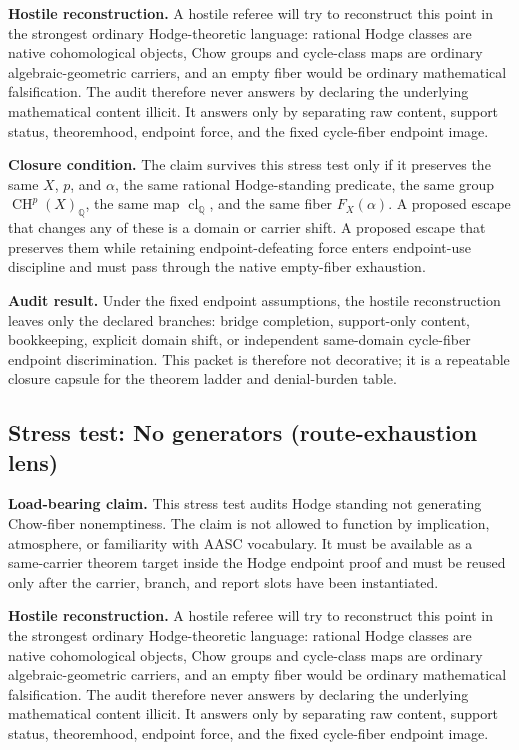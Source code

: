 \documentclass[11pt]{article}
\newcommand{\QQ}{\mathbb{Q}}
\newcommand{\CH}{\operatorname{CH}}
\newcommand{\clQ}{\operatorname{cl}_{\QQ}}
\begin{document}
\par\noindent\textbf{Hostile reconstruction.} A hostile referee will try to reconstruct this point in the strongest ordinary Hodge-theoretic language: rational Hodge classes are native cohomological objects, Chow groups and cycle-class maps are ordinary algebraic-geometric carriers, and an empty fiber would be ordinary mathematical falsification. The audit therefore never answers by declaring the underlying mathematical content illicit. It answers only by separating raw content, support status, theoremhood, endpoint force, and the fixed cycle-fiber endpoint image.

\par\noindent\textbf{Closure condition.} The claim survives this stress test only if it preserves the same $X$, $p$, and $\alpha$, the same rational Hodge-standing predicate, the same group $\CH^p(X)_\QQ$, the same map $\clQ$, and the same fiber $F_X(\alpha)$. A proposed escape that changes any of these is a domain or carrier shift. A proposed escape that preserves them while retaining endpoint-defeating force enters endpoint-use discipline and must pass through the native empty-fiber exhaustion.

\par\noindent\textbf{Audit result.} Under the fixed endpoint assumptions, the hostile reconstruction leaves only the declared branches: bridge completion, support-only content, bookkeeping, explicit domain shift, or independent same-domain cycle-fiber endpoint discrimination. This packet is therefore not decorative; it is a repeatable closure capsule for the theorem ladder and denial-burden table.


\subsection{Stress test: No generators (route-exhaustion lens)}

\par\noindent\textbf{Load-bearing claim.} This stress test audits Hodge standing not generating Chow-fiber nonemptiness. The claim is not allowed to function by implication, atmosphere, or familiarity with AASC vocabulary. It must be available as a same-carrier theorem target inside the Hodge endpoint proof and must be reused only after the carrier, branch, and report slots have been instantiated.

\par\noindent\textbf{Hostile reconstruction.} A hostile referee will try to reconstruct this point in the strongest ordinary Hodge-theoretic language: rational Hodge classes are native cohomological objects, Chow groups and cycle-class maps are ordinary algebraic-geometric carriers, and an empty fiber would be ordinary mathematical falsification. The audit therefore never answers by declaring the underlying mathematical content illicit. It answers only by separating raw content, support status, theoremhood, endpoint force, and the fixed cycle-fiber endpoint image.
\end{document}

